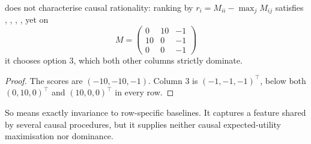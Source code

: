 \begin{proposition}\label{prop:regret}
 does not characterise causal rationality: ranking by $r_i=M_{ii}-\max_jM_{ij}$ satisfies
, , , , yet on
\[
  M=\begin{pmatrix}0&10&-1\\10&0&-1\\0&0&-1\end{pmatrix}
\]
it chooses option $3$, which both other columns strictly dominate.
\end{proposition}

\begin{proof}
The scores are $(-10,-10,-1)$. Column $3$ is $(-1,-1,-1)^\top$, below both $(0,10,0)^\top$ and
$(10,0,0)^\top$ in every row.
\end{proof}

So  means exactly invariance to row-specific baselines. It captures a feature shared by several
causal procedures, but it supplies neither causal expected-utility maximisation nor dominance.
